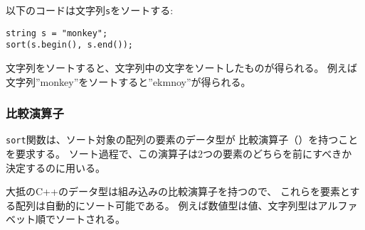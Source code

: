 \begin{comment}
The following code sorts the string \texttt{s}:
\begin{lstlisting}
string s = "monkey";
sort(s.begin(), s.end());
\end{lstlisting}
Sorting a string means that the characters
of the string are sorted.
For example, the string ''monkey'' becomes ''ekmnoy''.
\end{comment}

以下のコードは文字列\texttt{s}をソートする:
\begin{lstlisting}
string s = "monkey";
sort(s.begin(), s.end());
\end{lstlisting}
文字列をソートすると、文字列中の文字をソートしたものが得られる。
例えば文字列''monkey''をソートすると''ekmnoy''が得られる。

\begin{comment}
\subsubsection{Comparison operators}

\index{comparison operator}

The function \texttt{sort} requires that
a \key{comparison operator} is defined for the data type
of the elements to be sorted.
When sorting, this operator will be used
whenever it is necessary to find out the order of two elements.

Most C++ data types have a built-in comparison operator,
and elements of those types can be sorted automatically.
For example, numbers are sorted according to their values
and strings are sorted in alphabetical order.
\end{comment}

\subsubsection{比較演算子}


\texttt{sort}関数は、ソート対象の配列の要素のデータ型が
比較演算子（）を持つことを要求する。
ソート過程で、この演算子は2つの要素のどちらを前にすべきか
決定するのに用いる。

大抵のC++のデータ型は組み込みの比較演算子を持つので、
これらを要素とする配列は自動的にソート可能である。
例えば数値型は値、文字列型はアルファベット順でソートされる。


